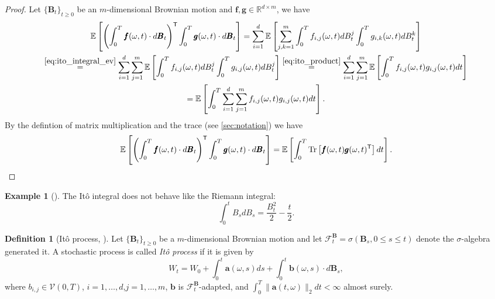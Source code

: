 \documentclass[12pt]{article}
\theoremstyle{definition}
\newtheorem{example}[example]{Example}
\newtheorem{definition}[definition]{Definition}
\numberwithin{equation}{section}
\newcommand{\R}{\mathbb{R}}
\newcommand{\CF}{\mathcal{F}}
\newcommand{\CV}{\mathcal{V}}
\newcommand{\T}{\mathsf{T}}
\newcommand{\ev}[1]{\mathbb{E}\left[{#1}\right]}
\newcommand{\norm}[1]{\lVert{#1}\rVert_2}
\DeclareMathOperator{\Tr}{Tr}
\begin{document}
\begin{proof}
  Let $\{\pmb{B}_t\}_{t\geq0}$ be an $m$-dimensional Brownian motion and $\pmb{f},\pmb{g}  \in \R^{d \times m}$, we have
\begin{multline*}
  \ev{\left(\int_0^T \pmb{f}(\omega, t)\cdot d\pmb{B}_t\right)^\mathsf{T}\int_0^T \pmb{g}(\omega, t)\cdot d\pmb{B}_t}
     = \sum_{i=1}^d \ev{\sum_{j,k=1}^m \int_0^T f_{i,j}(\omega, t)dB_t^j\int_0^T g_{i,k}(\omega, t)dB_t^k}\\
    \overset{\eqref{eq:ito_integral_ev}}{=} \sum_{i=1}^d \sum_{j=1}^m \ev{\int_0^T f_{i,j}(\omega, t)dB_t^j\int_0^T g_{i,j}(\omega, t)dB_t^j} 
    \overset{\eqref{eq:ito_product}}{=} \sum_{i=1}^d \sum_{j=1}^m \ev{\int_0^T f_{i,j}(\omega, t)g_{i,j}(\omega, t)dt} \\
    = \ev{\int_0^T \sum_{i=1}^d \sum_{j=1}^m f_{i,j}(\omega, t)g_{i,j}(\omega, t)dt}.
\end{multline*}
By the defintion of matrix multiplication and the trace (see \autoref{sec:notation}) we have 
\begin{equation*}
    \ev{\left(\int_0^T \pmb{f}(\omega, t)\cdot d\pmb{B}_t\right)^\mathsf{T}\int_0^T \pmb{g}(\omega, t)\cdot d\pmb{B}_t}
    = \ev{\int_0^T \Tr\left[\pmb{f}(\omega, t)\pmb{g}(\omega, t)^\T\right]dt}. \qedhere
\end{equation*}
\end{proof}
\begin{example}[]
  The Itô integral does not behave like the Riemann integral:
  \begin{equation*}
    \int_0^t B_s dB_s = \frac{B_t^2}{2} - \frac{t}{2}.
  \end{equation*}
\end{example}
\begin{definition}[Itô process, ]
  Let $\{\mathbf{B}_t\}_{t\geq 0}$ be a $m$-dimensional Brownian motion and let $\CF_t^\mathbf{B} = \sigma(\mathbf{B}_s, 0 \leq s \leq t)$ denote the $\sigma$-algebra generated it. A stochastic process is called \emph{Itô process} if it is given by
  \begin{equation}
    \label{eq:ito_process}
    W_t = W_0 + \int_0^t\mathbf{a}(\omega,s)ds + \int_0^t \mathbf{b}( \omega,s)\cdot d\mathbf{B}_s,
  \end{equation}
  where $b_{i,j} \in \CV(0,T)$, $i=1,\dots,d$,$j=1,\dots,m$, $\mathbf{b}$ is $\CF_t^\mathbf{B}$-adapted, and $\int_0^T \norm{\mathbf{a}(t, \omega)}dt < \infty$ almost surely.
\end{definition}
\end{document}
